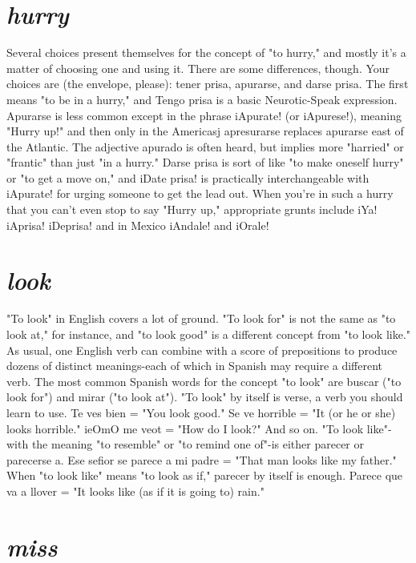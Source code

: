 \documentclass[14pt,a4paper,oneside]{memoir}
\begin{document}
\section{\emph{hurry}}

Several choices present themselves for the concept of "to
hurry," and mostly it's a matter of choosing one and using it. There are
some differences, though. Your choices are (the envelope, please): tener
prisa, apurarse, and darse prisa. The first means "to be in a hurry,"
and Tengo prisa is a basic Neurotic-Speak expression. Apurarse is less
common except in the phrase iApurate! (or iApurese!), meaning "Hurry
up!" and then only in the Americasj apresurarse replaces apurarse east
of the Atlantic. The adjective apurado is often heard, but implies more
"harried" or "frantic" than just "in a hurry." Darse prisa is sort of like
"to make oneself hurry" or "to get a move on," and iDate prisa! is
practically interchangeable with iApurate! for urging someone to get
the lead out. When you're in such a hurry that you can't even stop to
say "Hurry up," appropriate grunts include iYa! iAprisa! iDeprisa! and
in Mexico iAndale! and iOrale!

\section{\emph{look}}

"To look" in English covers a lot of ground. "To look for" is
not the same as "to look at," for instance, and "to look good" is a different concept from "to look like." As usual, one English verb can
combine with a score of prepositions to produce dozens of distinct
meanings-each of which in Spanish may require a different verb. The
most common Spanish words for the concept "to look" are buscar ("to
look for") and mirar ("to look at").
"To look" by itself is verse, a verb you should learn to use. Te
ves bien = "You look good." Se ve horrible = "It (or he or she) looks
horrible." ieOmO me veot = "How do I look?" And so on.
"To look like"-with the meaning "to resemble" or "to remind one of"-is either parecer or parecerse a. Ese sefior se parece a
mi padre = "That man looks like my father." When "to look like"
means "to look as if," parecer by itself is enough. Parece que va a
llover = "It looks like (as if it is going to) rain."

\section{\emph{miss}}
\end{document}
